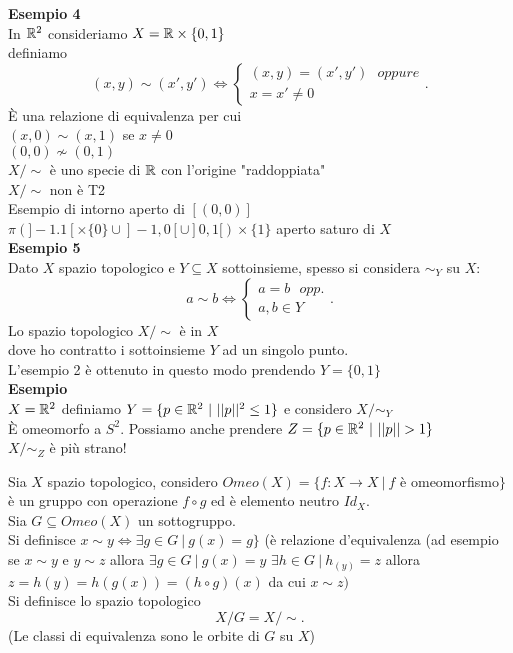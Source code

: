 \documentclass[12px]{article}
\begin{document}
	 \textbf{Esempio 4}\\
	 In $\mathbb{R}^2$ consideriamo  $X= \mathbb{R}\times\{0,1\}$\\
	 definiamo
	  \[
		  (x,y)\sim(x',y') \Leftrightarrow \begin{cases}
			  (x,y) = (x',y') \ \ \ oppure\\
			  x = x'\neq 0
		  \end{cases}
	 .\] 
	 È una relazione di equivalenza per cui \\
	 $(x,0)\sim (x,1) $ se $x\neq 0$\\
	  $(0,0)\not\sim (0,1)$\\
	   $X/\sim$ è uno specie di $\mathbb{R}$ con l'origine "raddoppiata"  \\
	   $X/\sim$ non è T2\\
	   Esempio di intorno  aperto di $[(0,0)]$\\
	   $\pi(]-1.1[\times\{0\}\cup]-1,0[\cup]0,1[)\times \{1\}$ aperto saturo di  $X$ \\
	   \textbf{Esempio 5}\\
Dato $X$ spazio topologico e $Y\subseteq X$ sottoinsieme, spesso si considera  $\sim_Y$ su $X$:
\[
a\sim b \Leftrightarrow \begin{cases}
	a = b \ \ \ opp.\\
	a,b\in Y
\end{cases}
.\] 
Lo spazio topologico $X/\sim$ è in $X$\\
dove ho contratto i sottoinsieme  $Y$ ad un singolo punto.\\
L'esempio 2 è ottenuto in questo modo prendendo $Y = \{0,1\}$ \\
\textbf{Esempio}\\
$X = \mathbb{R}^2$ definiamo $Y = \{p\in\mathbb{R}^2\ | \ ||p||^2 \leq 1\}$ e considero  $X/\sim_Y$\\
È omeomorfo a  $S^2$. Possiamo anche prendere  $Z = \{p\in \R^2\ | \ ||p|| > 1\}$ \\
$X/\sim_Z$ è più strano!
 \begin{defi}
	 Sia $X$ spazio topologico, considero $Omeo(X) = \{ f: X \rightarrow X\ | \ f$ è omeomorfismo$\}$ è un gruppo con operazione $f\circ g$ ed è elemento neutro  $Id_X$.\\
	 Sia  $G\subseteq Omeo(X)$ un sottogruppo.\\
 Si definisce  $x\sim y \Leftrightarrow \exists g\in G\ | \ g(x) = g\}$ (è relazione d'equivalenza (ad esempio se $x\sim y$ e $y\sim z$ allora  $\exists g\in G\ | \ g(x) = y$  $\exists h\in G \ | \ h_(y) = z$ allora $z = h(y) = h(g(x)) = (h\circ g)(x)$ da cui  $x\sim z)$ \\
 Si definisce lo spazio topologico
 \[
 X/G= X/\sim
 .\] 
 (Le classi di equivalenza sono le orbite di $G$ su $X$)
\end{defi}
\end{document}
